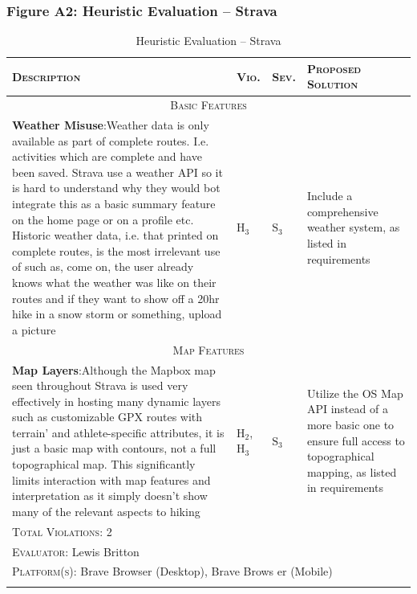 \documentclass[11pt, english]{article}
\begin{document}
\newpage

		\subsubsection*{Figure A2: Heuristic Evaluation -- Strava}

	\begin{center}
                \scriptsize
        	\begin{longtable}{p{7.5cm}p{0.5cm}p{0.5cm}p{4cm}}
                \textsc{Description} & \textsc{Vio.} & \textsc{Sev.} & \textsc{Proposed Solution}\\
		\hline
		\multicolumn{4}{c}{\textsc{Basic Features}}\\
		\hline
			\textbf{Weather Misuse}:\newline Weather data is only available as part of complete routes. I.e. activities which are complete and have been saved. Strava use a weather API so it is hard to understand why they would bot integrate this as a basic summary feature on the home page or on a profile etc. Historic weather data, i.e. that printed on complete routes, is the most irrelevant use of such as, come on, the user already knows what the weather was like on their routes and if they want to show off a 20hr hike in a snow storm or something, upload a picture & $\mathrm{H_{3}}$ & $\mathrm{S_{3}}$ & Include a comprehensive weather system, as listed in requirements\\
		\hline
		\multicolumn{4}{c}{\textsc{Map Features}}\\
		\hline
			\textbf{Map Layers}:\newline Although the Mapbox map seen throughout Strava is used very effectively in hosting many dynamic layers such as customizable GPX routes with terrain' and athlete-specific attributes, it is just a basic map with contours, not a full topographical map. This significantly limits interaction with map features and interpretation as it simply doesn't show many of the relevant aspects to hiking & $\mathrm{H_{2}}$, $\mathrm{H_{3}}$ & $\mathrm{S_{3}}$ & Utilize the OS Map API instead of a more basic one to ensure full access to topographical mapping, as listed in requirements\\
		\hline
                \multicolumn{4}{l}{\textsc{Total Violations}: 2}\\
                \multicolumn{4}{l}{\textsc{Evaluator}: Lewis Britton}\\
                \multicolumn{4}{l}{\textsc{Platform(s)}: Brave Browser (Desktop), Brave Brows
er (Mobile)}\\
                \hline
                \caption{Heuristic Evaluation -- Strava}
        \end{longtable}
        \end{center}
\end{document}
